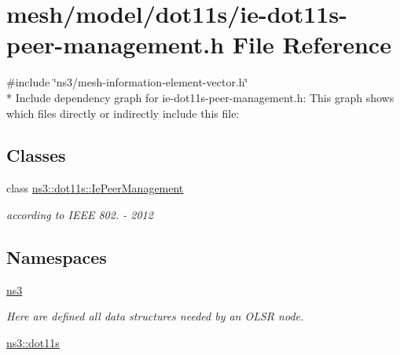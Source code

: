 \hypertarget{ie-dot11s-peer-management_8h}{}\section{mesh/model/dot11s/ie-\/dot11s-\/peer-\/management.h File Reference}
\label{ie-dot11s-peer-management_8h}
{\ttfamily \#include \char`\"{}ns3/mesh-\/information-\/element-\/vector.\+h\char`\"{}}\\*
Include dependency graph for ie-\/dot11s-\/peer-\/management.h\+:
This graph shows which files directly or indirectly include this file\+:
\subsection*{Classes}
\begin{DoxyCompactItemize}
\item 
class \hyperlink{classns3_1_1dot11s_1_1IePeerManagement}{ns3\+::dot11s\+::\+Ie\+Peer\+Management}
\begin{DoxyCompactList}\small\item\em according to I\+E\+EE 802. -\/ 2012 \end{DoxyCompactList}\end{DoxyCompactItemize}
\subsection*{Namespaces}
\begin{DoxyCompactItemize}
\item 
 \hyperlink{namespacens3}{ns3}
\begin{DoxyCompactList}\small\item\em Here are defined all data structures needed by an O\+L\+SR node. \end{DoxyCompactList}\item 
 \hyperlink{namespacens3_1_1dot11s}{ns3\+::dot11s}
\end{DoxyCompactItemize}
